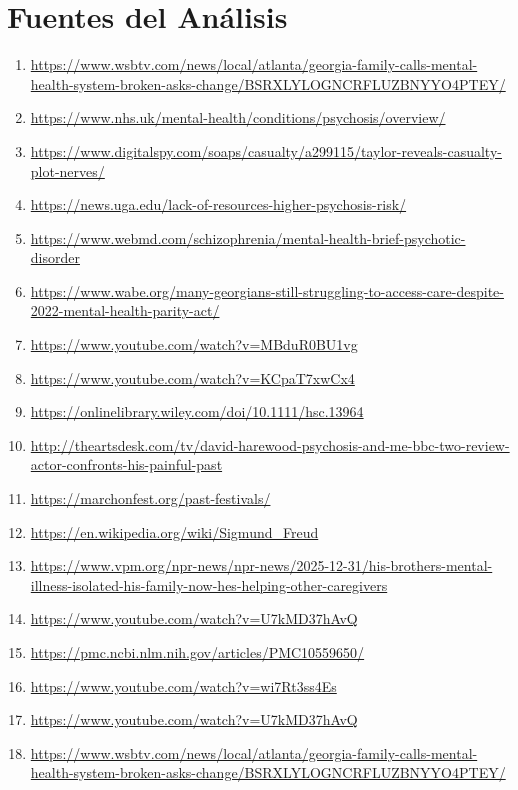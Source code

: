 \documentclass[10pt,a4paper]{article}
\begin{document}
\section*{Fuentes del Análisis}
    \begin{enumerate}[leftmargin=*]
            \item \url{ https://www.wsbtv.com/news/local/atlanta/georgia-family-calls-mental-health-system-broken-asks-change/BSRXLYLOGNCRFLUZBNYYO4PTEY/ }
            \item \url{ https://www.nhs.uk/mental-health/conditions/psychosis/overview/ }
            \item \url{ https://www.digitalspy.com/soaps/casualty/a299115/taylor-reveals-casualty-plot-nerves/ }
            \item \url{ https://news.uga.edu/lack-of-resources-higher-psychosis-risk/ }
            \item \url{ https://www.webmd.com/schizophrenia/mental-health-brief-psychotic-disorder }
            \item \url{ https://www.wabe.org/many-georgians-still-struggling-to-access-care-despite-2022-mental-health-parity-act/ }
            \item \url{ https://www.youtube.com/watch?v=MBduR0BU1vg }
            \item \url{ https://www.youtube.com/watch?v=KCpaT7xwCx4 }
            \item \url{ https://onlinelibrary.wiley.com/doi/10.1111/hsc.13964 }
            \item \url{ http://theartsdesk.com/tv/david-harewood-psychosis-and-me-bbc-two-review-actor-confronts-his-painful-past }
            \item \url{ https://marchonfest.org/past-festivals/ }
            \item \url{ https://en.wikipedia.org/wiki/Sigmund\_Freud }
            \item \url{ https://www.vpm.org/npr-news/npr-news/2025-12-31/his-brothers-mental-illness-isolated-his-family-now-hes-helping-other-caregivers }
            \item \url{ https://www.youtube.com/watch?v=U7kMD37hAvQ }
            \item \url{ https://pmc.ncbi.nlm.nih.gov/articles/PMC10559650/ }
            \item \url{ https://www.youtube.com/watch?v=wi7Rt3ss4Es }
            \item \url{ https://www.youtube.com/watch?v=U7kMD37hAvQ }
            \item \url{ https://www.wsbtv.com/news/local/atlanta/georgia-family-calls-mental-health-system-broken-asks-change/BSRXLYLOGNCRFLUZBNYYO4PTEY/ }

\end{enumerate}
\end{document}
